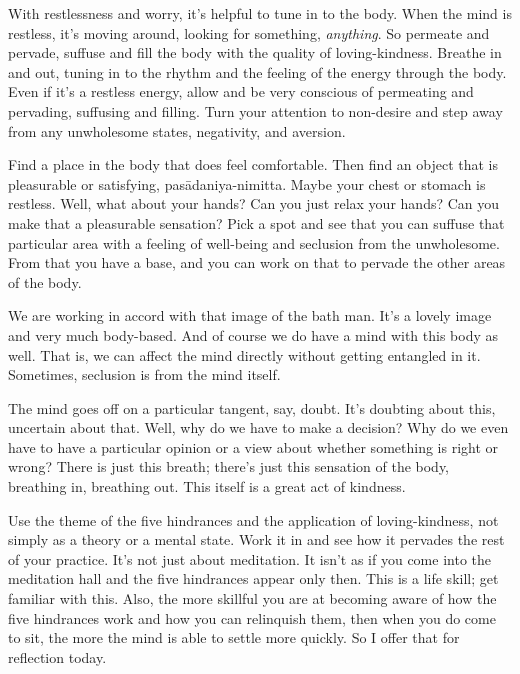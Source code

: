 With restlessness and worry, it’s helpful to tune in to the body. When
the mind is restless, it’s moving around, looking for something,
\emph{anything}. So permeate and pervade, suffuse and fill the body with
the quality of loving-kindness. Breathe in and out, tuning in to the
rhythm and the feeling of the energy through the body. Even if it’s a
restless energy, allow and be very conscious of permeating and
pervading, suffusing and filling. Turn your attention to non-desire and
step away from any unwholesome states, negativity, and aversion.

Find a place in the body that does feel comfortable. Then find an object
that is pleasurable or satisfying, pasādaniya-nimitta. Maybe your chest
or stomach is restless. Well, what about your hands? Can you just relax
your hands? Can you make that a pleasurable sensation? Pick a spot and
see that you can suffuse that particular area with a feeling of
well-being and seclusion from the unwholesome. From that you have a
base, and you can work on that to pervade the other areas of the body.

We are working in accord with that image of the bath man. It’s a lovely
image and very much body-based. And of course we do have a mind with
this body as well. That is, we can affect the mind directly without
getting entangled in it. Sometimes, seclusion is from the mind itself.

The mind goes off on a particular tangent, say, doubt. It’s doubting
about this, uncertain about that. Well, why do we have to make a
decision? Why do we even have to have a particular opinion or a view
about whether something is right or wrong? There is just this breath;
there’s just this sensation of the body, breathing in, breathing out.
This itself is a great act of kindness.

Use the theme of the five hindrances and the application of
loving-kindness, not simply as a theory or a mental state. Work it in
and see how it pervades the rest of your practice. It’s not just about
meditation. It isn’t as if you come into the meditation hall and the
five hindrances appear only then. This is a life skill; get familiar
with this. Also, the more skillful you are at becoming aware of how the
five hindrances work and how you can relinquish them, then when you do
come to sit, the more the mind is able to settle more quickly. So I
offer that for reflection today.
